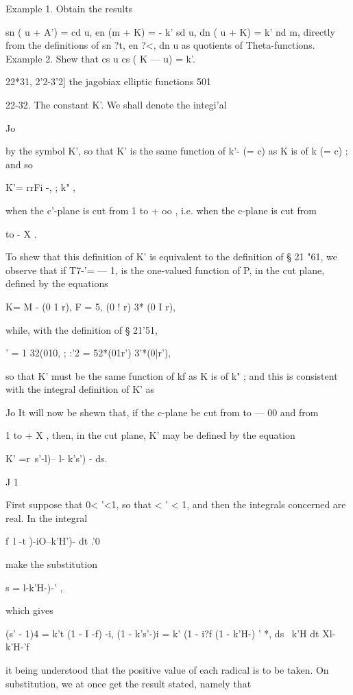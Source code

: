 Example 1. Obtain the results

sn ( u + A') = cd u, en (m + K) = - k' sd u, dn ( u + K) = k' nd m,
directly from the definitions of sn ?t, en ?<, dn u as quotients of
Theta-functions. Example 2. Shew that cs u cs ( K — u) = k'.



22*31, 2'2-3'2] the jagobiax elliptic functions 501

22-32. The constant K'. We shall denote the integi'al

Jo

by the symbol K', so that K' is the same function of k'- (= c) as K is
of k (= c) ; and so

K'= rrFi -, ; k" ,

when the c'-plane is cut from 1 to + oo , i.e. when the c-plane is cut
from

to - X .

To shew that this definition of K' is equivalent to the definition of
§ 21 "61, we observe that if T7-'= — 1, is the one-valued function of
P, in the cut plane, defined by the equations

K= M - (0 1 r), F = 5, (0 ! r) 3* (0 I r),

while, with the definition of § 21'51,

 ' = 1 32(010, ; :'2 = 52*(01r') 3'*(0|r'),

so that K' must be the same function of kf as K is of k" ; and this is
consistent with the integral definition of K' as

Jo It will now be shewn that, if the c-plane be cut from to — 00 and
from

1 to + X , then, in the cut plane, K' may be defined by the equation

K' =r\ s'-l)-- l- k's') - ds.

J 1

First suppose that 0< '<1, so that < ' < 1, and then the integrals
concerned are real. In the integral

f\ l -t )-iO--k'H')- dt .'0

make the substitution

s = l-k'H-)-' ,

which gives

(s' - 1)4 = k't (1 - I -f) -i, (1 - k's'-)i = k' (1 - i?f (1 - k'H-) '
*, ds \ k'H dt Xl-k'H-'f

it being understood that the positive value of each radical is to be
taken. On substitution, we at once get the result stated, namely that

